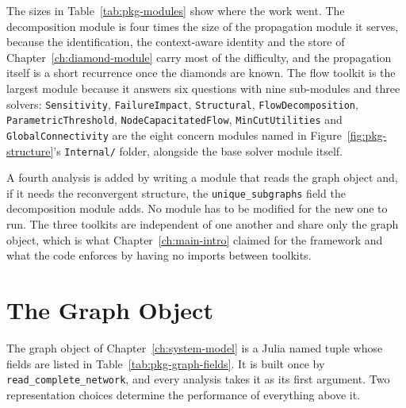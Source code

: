 \documentclass[12pt]{report}
\begin{document}
The sizes in Table~\ref{tab:pkg-modules} show where the work went. The
decomposition module is four times the size of the propagation module it serves, because the
identification, the context-aware identity and the store of Chapter~\ref{ch:diamond-module}
carry most of the difficulty, and the propagation itself is a short recurrence once the
diamonds are known. The flow toolkit is the largest module because it answers six questions
with nine sub-modules and three solvers: \texttt{Sensitivity}, \texttt{FailureImpact},
\texttt{Structural}, \texttt{FlowDecomposition}, \texttt{ParametricThreshold},
\texttt{NodeCapacitatedFlow}, \texttt{MinCutUtilities} and \texttt{GlobalConnectivity} are
the eight concern modules named in Figure~\ref{fig:pkg-structure}'s \texttt{Internal/}
folder, alongside the base solver module itself.

A fourth analysis is added by writing a module that reads the graph object and, if it needs
the reconvergent structure, the \texttt{unique\_subgraphs} field the decomposition module
adds. No module has to be modified for the new one to run. The three toolkits are
independent of one another and share only the graph object, which is what
Chapter~\ref{ch:main-intro} claimed for the framework and what the code enforces by having
no imports between toolkits.

\section{The Graph Object}
\label{sec:pkg-graph}

The graph object of Chapter~\ref{ch:system-model} is a Julia named tuple whose fields are
listed in Table~\ref{tab:pkg-graph-fields}. It is built once by
\texttt{read\_complete\_network}, and every analysis takes it as its first argument. Two
representation choices determine the performance of everything above it.
\end{document}

